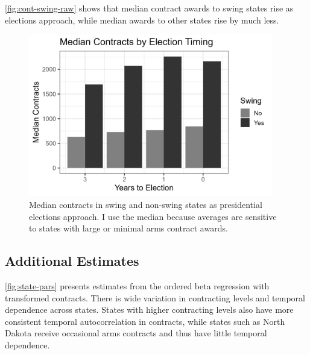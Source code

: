 \documentclass[12pt]{article}
\begin{document}
\autoref{fig:cont-swing-raw} shows that median contract awards to swing states rise as elections approach, while median awards to other states rise by much less. 

\begin{figure}[htpb]
	\centering
		\includegraphics[width=0.95\textwidth]{cont-swing-raw.png}
	\caption{Median contracts in swing and non-swing states as presidential elections approach. I use the median because averages are sensitive to states with large or minimal arms contract awards. }
	\label{fig:cont-swing-raw}
\end{figure}


\subsection{Additional Estimates}


\autoref{fig:state-pars} presents estimates from the ordered beta regression with transformed contracts. 
There is wide variation in contracting levels and temporal dependence across states. 
States with higher contracting levels also have more consistent temporal autocorrelation in contracts, while states such as North Dakota receive occasional arms contracts and thus have little temporal dependence. 
\end{document}
